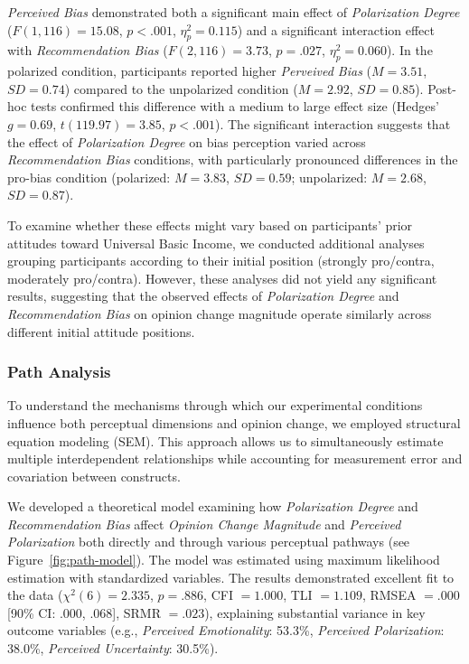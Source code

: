 \emph{Perceived Bias} demonstrated both a significant main effect of \emph{Polarization Degree} ($F(1, 116) = 15.08$, $p < .001$, $\eta_p^2 = 0.115$) and a significant interaction effect with \emph{Recommendation Bias} ($F(2, 116) = 3.73$, $p = .027$, $\eta_p^2 = 0.060$). In the polarized condition, participants reported higher \emph{Perveived Bias} ($M = 3.51$, $SD = 0.74$) compared to the unpolarized condition ($M = 2.92$, $SD = 0.85$). Post-hoc tests confirmed this difference with a medium to large effect size (Hedges' $g = 0.69$, $t(119.97) = 3.85$, $p < .001$). The significant interaction suggests that the effect of \emph{Polarization Degree} on bias perception varied across \emph{Recommendation Bias} conditions, with particularly pronounced differences in the pro-bias condition (polarized: $M = 3.83$, $SD = 0.59$; unpolarized: $M = 2.68$, $SD = 0.87$).

To examine whether these effects might vary based on participants' prior attitudes toward Universal Basic Income, we conducted additional analyses grouping participants according to their initial position (strongly pro/contra, moderately pro/contra). However, these analyses did not yield any significant results, suggesting that the observed effects of \emph{Polarization Degree} and \emph{Recommendation Bias} on opinion change magnitude operate similarly across different initial attitude positions.

\subsubsection{Path Analysis}

To understand the mechanisms through which our experimental conditions influence both perceptual dimensions and opinion change, we employed structural equation modeling (SEM). This approach allows us to simultaneously estimate multiple interdependent relationships while accounting for measurement error and covariation between constructs.



We developed a theoretical model examining how \emph{Polarization Degree} and \emph{Recommendation Bias} affect \emph{Opinion Change Magnitude} and \emph{Perceived Polarization} both directly and through various perceptual pathways (see Figure~\ref{fig:path-model}). The model was estimated using maximum likelihood estimation with standardized variables. The results demonstrated excellent fit to the data ($\chi^2(6) = 2.335$, $p = .886$, CFI $= 1.000$, TLI $= 1.109$, RMSEA $= .000$ [90\% CI: .000, .068], SRMR $= .023$), explaining substantial variance in key outcome variables (e.g., \emph{Perceived Emotionality}: 53.3\%, \emph{Perceived Polarization}: 38.0\%, \emph{Perceived Uncertainty}: 30.5\%).

